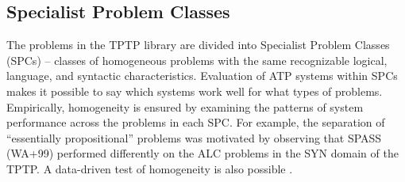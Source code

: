 \documentclass[runningheads]{llncs}
\begin{document}
\subsection{Specialist Problem Classes}
\label{SPCs}

The problems in the TPTP library are divided into Specialist Problem Classes (SPCs) -- classes of 
homogeneous problems with the same recognizable logical, language, and syntactic characteristics.
Evaluation of ATP systems within SPCs makes it possible to say which systems work well for what 
types of problems. 
Empirically, homogeneity is ensured by examining the patterns of system performance across the 
problems in each SPC. 
For example, the separation of ``essentially propositional'' problems was motivated by observing 
that SPASS (WA+99) performed differently on the ALC problems in the SYN domain of the TPTP.
A data-driven test of homogeneity is also possible \cite{FS02}.
\end{document}
